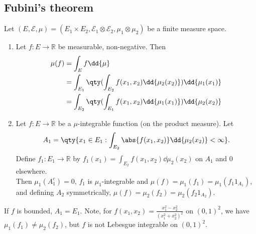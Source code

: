 \subsection{Fubini's theorem}
\begin{theorem}
	Let $(E, \mathcal E, \mu) = (E_1 \times E_2, \mathcal E_1 \otimes \mathcal E_2, \mu_1 \otimes \mu_2)$ be a finite measure space.
	\begin{enumerate}
		\item Let $f \colon E \to \mathbb R$ be measurable, non-negative.
		Then
		\begin{align*}
			\mu(f) &= \int_E f \dd{\mu} \\
			&= \int_{E_1} \qty( \int_{E_2} f(x_1,x_2) \dd{\mu_2(x_2)} ) \dd{\mu_1(x_1)} \\
			&= \int_{E_2} \qty( \int_{E_1} f(x_1,x_2) \dd{\mu_1(x_1)} ) \dd{\mu_2(x_2)}
		\end{align*}
		\item Let $f \colon E \to \mathbb R$ be a $\mu$-integrable function (on the product measure).
		Let
		\[ A_1 = \qty{x_1 \in E_1 : \int_{E_2} \abs{f(x_1,x_2)} \dd{\mu_2(x_2)} < \infty}. \]
		Define $f_1 : E_1 \to \mathbb{R}$ by $f_1(x_1) = \int_{E_2} f(x_1,x_2) \dd{\mu_2(x_2)}$ on $A_1$ and 0 elsewhere. \\
		Then $\mu_1(A_1^c) = 0$, $f_1$ is $\mu_1$-integrable and $\mu(f) = \mu_1(f_1) = \mu_1(f_1 1_{A_1})$, and defining $A_2$ symmetrically, $\mu(f) = \mu_2(f_2) = \mu_2(f_2 1_{A_2})$.
	\end{enumerate}
\end{theorem}

\begin{remark}
	If $f$ is bounded, $A_1 = E_1$.
	Note, for $f(x_1,x_2) = \frac{x_1^2-x_2^2}{(x_1^2+x_2^2)^2}$ on $(0,1)^2$, we have $\mu_1(f_1) \neq \mu_2(f_2)$, but $f$ is not Lebesgue integrable on $(0,1)^2$.
\end{remark}

